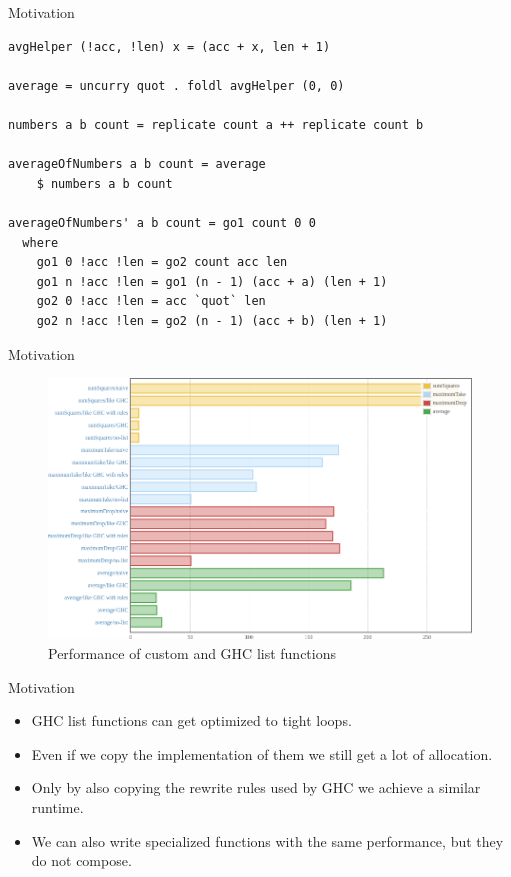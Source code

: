 \documentclass[11pt]{beamer}
\begin{document}
\begin{frame}[fragile]{Motivation}
\begin{verbatim}
avgHelper (!acc, !len) x = (acc + x, len + 1)

average = uncurry quot . foldl avgHelper (0, 0)

numbers a b count = replicate count a ++ replicate count b

averageOfNumbers a b count = average
    $ numbers a b count

averageOfNumbers' a b count = go1 count 0 0
  where
    go1 0 !acc !len = go2 count acc len
    go1 n !acc !len = go1 (n - 1) (acc + a) (len + 1)
    go2 0 !acc !len = acc `quot` len
    go2 n !acc !len = go2 (n - 1) (acc + b) (len + 1)
\end{verbatim}
\end{frame}

\begin{frame}{Motivation}
	\begin{figure}
		\centering
		\includegraphics[width=1\textwidth]{benchmark.png}
		\caption{Performance of custom and GHC list functions}
		\label{fig-benchmark}
	\end{figure}
\end{frame}

\begin{frame}{Motivation}
	\begin{itemize}
		\item GHC list functions can get optimized to tight loops.
		\item Even if we copy the implementation of them we still get a lot of allocation.
		\item Only by also copying the rewrite rules used by GHC we achieve a similar runtime.
		\item We can also write specialized functions with the same performance, but they do not compose.
	\end{itemize}
\end{frame}
\end{document}
